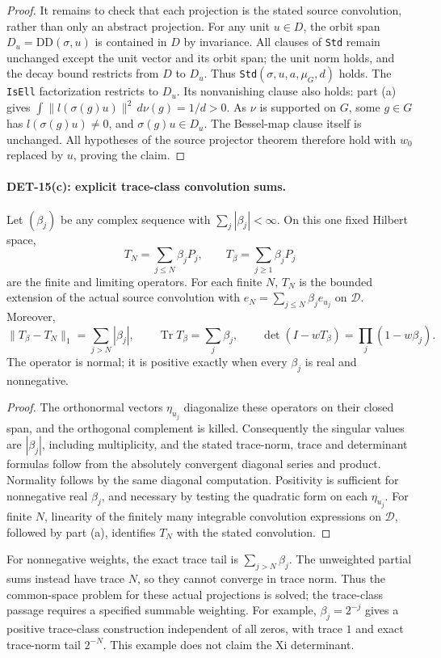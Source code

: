 \documentclass[11pt,a4paper]{article}
\newcommand{\Tr}{\operatorname{Tr}}
\begin{document}
\begin{proof}
It remains to check that each projection is the stated source
convolution, rather than only an abstract projection. For any unit
\(u\in D\), the orbit span \(D_u=\mathrm{DD}(\sigma,u)\) is
contained in \(D\) by invariance. All clauses of \texttt{Std}
remain unchanged except the unit vector and its orbit span;
the unit norm holds, and the decay bound restricts from \(D\)
to \(D_u\). Thus \texttt{Std}\((\sigma,u,a,\mu_G,d)\) holds.
The \texttt{IsEll} factorization restricts to \(D_u\).
Its nonvanishing clause also holds: part (a) gives
\(\int\|l(\sigma(g)u)\|^2\,d\nu(g)=1/d>0\).
As \(\nu\) is supported on \(G\), some \(g\in G\) has
\(l(\sigma(g)u)\ne0\), and \(\sigma(g)u\in D_u\).
The Bessel-map clause itself is unchanged.
All hypotheses of the source projector theorem therefore hold
with \(w_0\) replaced by \(u\), proving the claim.
\end{proof}

\paragraph{DET-15(c): explicit trace-class convolution sums.}
Let \((\beta_j)\) be any complex sequence with
\(\sum_j|\beta_j|<\infty\). On this one fixed Hilbert space,
\[
 T_N=\sum_{j\le N}\beta_jP_j,\qquad
 T_\beta=\sum_{j\ge1}\beta_jP_j
\]
are the finite and limiting operators. For each finite \(N\),
\(T_N\) is the bounded extension of the actual source convolution
with \(e_N=\sum_{j\le N}\beta_j e_{u_j}\) on \(\mathcal D\).
Moreover,
\[
 \|T_\beta-T_N\|_1=\sum_{j>N}|\beta_j|,\qquad
 \Tr T_\beta=\sum_j\beta_j,\qquad
 \det(I-wT_\beta)=\prod_j(1-w\beta_j).
\]
The operator is normal; it is positive exactly when every
\(\beta_j\) is real and nonnegative.
\begin{proof}
The orthonormal vectors \(\eta_{u_j}\) diagonalize these operators
on their closed span, and the orthogonal complement is killed.
Consequently the singular values are \(|\beta_j|\), including
multiplicity, and the stated trace-norm, trace and determinant
formulas follow from the absolutely convergent diagonal series
and product. Normality follows by the same diagonal computation.
Positivity is sufficient for nonnegative real \(\beta_j\), and
necessary by testing the quadratic form on each \(\eta_{u_j}\).
For finite \(N\), linearity of the finitely many integrable
convolution expressions on \(\mathcal D\), followed by part (a),
identifies \(T_N\) with the stated convolution.
\end{proof}
For nonnegative weights, the exact trace tail is \(\sum_{j>N}\beta_j\).
The unweighted partial sums instead have trace \(N\), so they
cannot converge in trace norm. Thus the common-space problem for
these actual projections is solved; the trace-class passage
requires a specified summable weighting.
For example, \(\beta_j=2^{-j}\) gives a positive trace-class
construction independent of all zeros, with trace \(1\) and
exact trace-norm tail \(2^{-N}\). This example does not claim
the Xi determinant.
\end{document}
